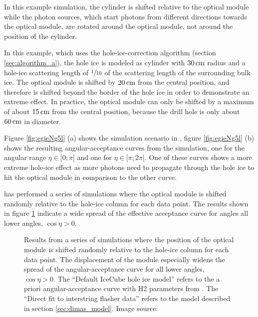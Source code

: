 In this example simulation, the cylinder is shifted relative to the
optical module while the photon sources, which start photons from
different directions towards the optical module, are rotated around the
optical module, not around the position of the cylinder.


In this example, which uses the hole-ice-correction algorithm (section
\ref{sec:algorithm_a}), the hole ice is modeled as cylinder with
\(30\text{\,cm}\) radius and a hole-ice scattering length of \(\sfrac{1}{10}\)
of the scattering length of the surrounding bulk ice. The optical module
is shifted by \(20\text{\,cm}\) from the central position, and therefore is
shifted beyond the border of the hole ice in order to demonstrate an
extreme effect. In practice, the optical module can only be shifted by a
maximum of about \(15\text{\,cm}\) from the central position, because the drill
hole is only about \(60\text{\,cm}\) in diameter.

Figure \ref{fig:egieNg5l} (a) shows the simulation scenario in
\steamshovel, figure \ref{fig:egieNg5l} (b) shows the resulting
angular-acceptance curves from the simulation, one for the angular range
\(\eta \in [0;\pi[\) and one for \(\eta \in [\pi; 2\pi[\). One of these
curves shows a more extreme hole-ice effect as more photons need to
propagate through the hole ice to hit the optical module in comparison
to the other curve.

\rongen \cite{icrc17pocam} has performed a series of simulations where
the optical module is shifted randomly relative to the hole-ice column
for each data point. The results shown in figure \ref{fig:zao5Mah0}
indicate a wide spread of the effective acceptance curve for angles all
lower angles, \(\cos \eta > 0\).

\begin{figure}[htbp]
  \caption{Results from a series of simulations where the position of the optical module is shifted randomly relative to the hole-ice column for each data point. The displacement of the module especially widens the spread of the angular-acceptance curve for all lower angles, $\cos \eta > 0$. The \enquote{Default IceCube hole ice model} refers to the a priori angular-acceptance curve with H2 parameters from \cite{icepaper}. The \enquote{Direct fit to interstring flasher data} refers to the model described in section \ref{sec:dimas_model}. Image source: \cite{icrc17pocam}}
  \label{fig:zao5Mah0}
\end{figure}
